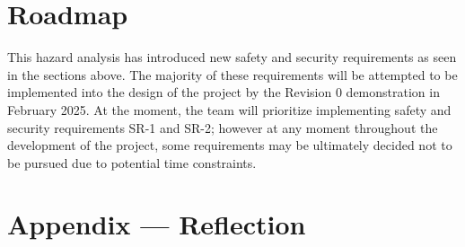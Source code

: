 \documentclass{article}
\begin{document}
\section{Roadmap}

This hazard analysis has introduced new safety and security requirements as seen in the sections above. The majority of these requirements will be attempted to be implemented into the design of the project by the Revision 0 demonstration in February 2025. At the moment, the team will prioritize implementing safety and security requirements SR-1 and SR-2; however at any moment throughout the development of the project, some requirements may be ultimately decided not to be pursued due to potential time constraints. 

\newpage{}

\section*{Appendix --- Reflection}


\end{document}
